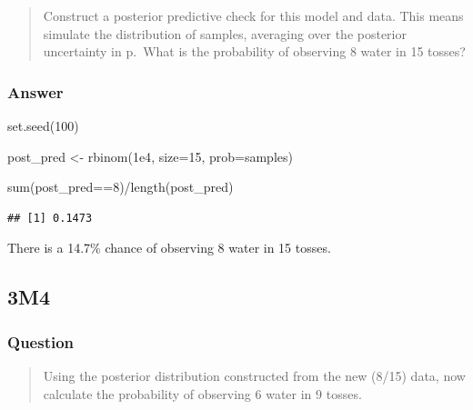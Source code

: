 \documentclass[
]{book}
\newenvironment{Shaded}{\begin{snugshade}}{\end{snugshade}}
\newcommand{\AttributeTok}[1]{\textcolor[rgb]{0.77,0.63,0.00}{#1}}
\newcommand{\DecValTok}[1]{\textcolor[rgb]{0.00,0.00,0.81}{#1}}
\newcommand{\FloatTok}[1]{\textcolor[rgb]{0.00,0.00,0.81}{#1}}
\newcommand{\FunctionTok}[1]{\textcolor[rgb]{0.00,0.00,0.00}{#1}}
\newcommand{\NormalTok}[1]{#1}
\newcommand{\OtherTok}[1]{\textcolor[rgb]{0.56,0.35,0.01}{#1}}
\newcommand{\SpecialCharTok}[1]{\textcolor[rgb]{0.00,0.00,0.00}{#1}}
\begin{document}
\begin{quote}
Construct a posterior predictive check for this model and data. This means simulate the distribution of samples, averaging over the posterior uncertainty in p.~What is the probability of observing 8 water in 15 tosses?
\end{quote}

\hypertarget{answer-24}{%
\subsubsection*{Answer}\label{answer-24}}

\begin{Shaded}
\begin{Highlighting}[]
\FunctionTok{set.seed}\NormalTok{(}\DecValTok{100}\NormalTok{) }

\NormalTok{post\_pred }\OtherTok{\textless{}{-}} \FunctionTok{rbinom}\NormalTok{(}\FloatTok{1e4}\NormalTok{, }\AttributeTok{size=}\DecValTok{15}\NormalTok{, }\AttributeTok{prob=}\NormalTok{samples)}

\FunctionTok{sum}\NormalTok{(post\_pred}\SpecialCharTok{==}\DecValTok{8}\NormalTok{)}\SpecialCharTok{/}\FunctionTok{length}\NormalTok{(post\_pred)}
\end{Highlighting}
\end{Shaded}

\begin{verbatim}
## [1] 0.1473
\end{verbatim}

There is a 14.7\% chance of observing 8 water in 15 tosses.

\hypertarget{m4-1}{%
\subsection*{3M4}\label{m4-1}}

\hypertarget{question-25}{%
\subsubsection*{Question}\label{question-25}}

\begin{quote}
Using the posterior distribution constructed from the new (8/15) data, now calculate the probability of observing 6 water in 9 tosses.
\end{quote}
\end{document}
